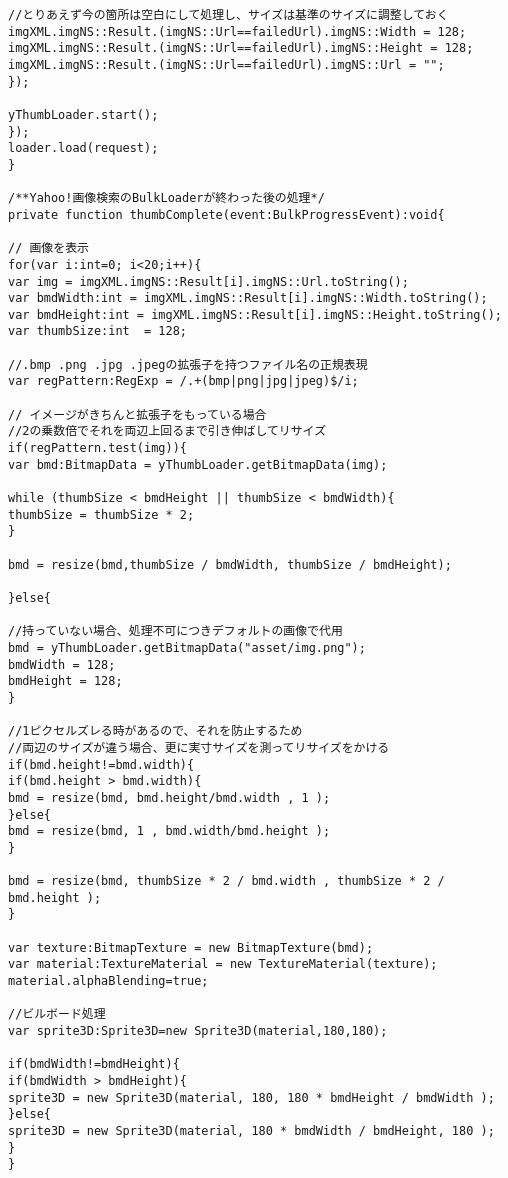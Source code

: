 {\begin{verbatim}
//とりあえず今の箇所は空白にして処理し、サイズは基準のサイズに調整しておく
imgXML.imgNS::Result.(imgNS::Url==failedUrl).imgNS::Width = 128;
imgXML.imgNS::Result.(imgNS::Url==failedUrl).imgNS::Height = 128;
imgXML.imgNS::Result.(imgNS::Url==failedUrl).imgNS::Url = "";
});

yThumbLoader.start();
});
loader.load(request);
}

/**Yahoo!画像検索のBulkLoaderが終わった後の処理*/
private function thumbComplete(event:BulkProgressEvent):void{

// 画像を表示
for(var i:int=0; i<20;i++){
var img = imgXML.imgNS::Result[i].imgNS::Url.toString();
var bmdWidth:int = imgXML.imgNS::Result[i].imgNS::Width.toString();
var bmdHeight:int = imgXML.imgNS::Result[i].imgNS::Height.toString();
var thumbSize:int  = 128;

//.bmp .png .jpg .jpegの拡張子を持つファイル名の正規表現
var regPattern:RegExp = /.+(bmp|png|jpg|jpeg)$/i;

// イメージがきちんと拡張子をもっている場合
//2の乗数倍でそれを両辺上回るまで引き伸ばしてリサイズ
if(regPattern.test(img)){
var bmd:BitmapData = yThumbLoader.getBitmapData(img);

while (thumbSize < bmdHeight || thumbSize < bmdWidth){
thumbSize = thumbSize * 2;
}

bmd = resize(bmd,thumbSize / bmdWidth, thumbSize / bmdHeight);

}else{

//持っていない場合、処理不可につきデフォルトの画像で代用
bmd = yThumbLoader.getBitmapData("asset/img.png");
bmdWidth = 128;
bmdHeight = 128;
}

//1ピクセルズレる時があるので、それを防止するため
//両辺のサイズが違う場合、更に実寸サイズを測ってリサイズをかける
if(bmd.height!=bmd.width){
if(bmd.height > bmd.width){
bmd = resize(bmd, bmd.height/bmd.width , 1 );
}else{
bmd = resize(bmd, 1 , bmd.width/bmd.height );
}

bmd = resize(bmd, thumbSize * 2 / bmd.width , thumbSize * 2 / bmd.height );
}

var texture:BitmapTexture = new BitmapTexture(bmd);
var material:TextureMaterial = new TextureMaterial(texture);
material.alphaBlending=true;

//ビルボード処理
var sprite3D:Sprite3D=new Sprite3D(material,180,180);

if(bmdWidth!=bmdHeight){
if(bmdWidth > bmdHeight){
sprite3D = new Sprite3D(material, 180, 180 * bmdHeight / bmdWidth );
}else{
sprite3D = new Sprite3D(material, 180 * bmdWidth / bmdHeight, 180 );
}
}


\end{verbatim}}
